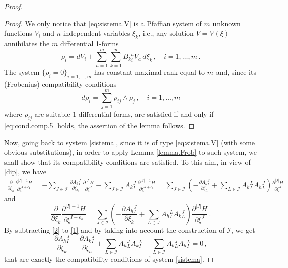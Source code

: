 \documentclass{article}
\newcommand{\I}{\mathcal{I}}
\newcommand{\de}{\partial}
\begin{document}
\begin{proof}
\begin{proof}
We only notice that \eqref{eq:sistema.V} is a Pfaffian system of $m$ unknown functions $V_i$ and $n$ independent variables $\xi_k$, i.e., any solution $V=V(\xi)$ annihilates the $m$ differential 1-forms
$$
\rho_i= d V_i + \sum_{a=1}^m\sum_{k=1}^n B_k{}^a_i V_a\, d\xi_k\,, \quad i=1,\dots, m\,.
$$
The system $\{\rho_i=0\}_{i=1,\dots,m}$ has constant maximal rank equal to $m$ and, since its (Frobenius) compatibility conditions
$$
d\rho_i=\sum_{j=1}^m\rho_{ij}\wedge\rho_j\,,\quad i=1,\dots,m
$$
where $\rho_{ij}$ are suitable $1$-differential forms,
are satisfied if and only if \eqref{eq:cond.comp.5} holds, the assertion of the lemma follows.
\end{proof}
Now, going back to system \eqref{sistema}, since it is of type \eqref{eq:sistema.V} (with some obvious substitutions), in order to apply Lemma \ref{lemma.Frob} to such system,
we shall show that its compatibility conditions are satisfied. To this aim, in view of \eqref{dip}, we have
\begin{multline}\label{1}
\frac{\de}{\de \xi_h}     \frac{\de^{|I|+1} H }{\de\xi^{I+e_k} }= 
- \sum_{J\in\mathcal{I}} \frac{\de A_k{}^J_I }{\de\xi_h }
 \,  \frac{\de^{|J|} H }{\de\xi^J }-  \sum_{J\in\mathcal{I}} A_k{}^J_I\,    \frac{\de^{|J|+1} H }{\de\xi^{J+e_h} }
= \sum_{J\in\mathcal{I}}\left( -  \frac{\de  A_k{}^J_I}{\de \xi_h } +  \sum_{L\in\mathcal{I}}A_k{}^L_I A_h{}^J_L\right)   \frac{\de^{|J|} H }{\de\xi^J }
\end{multline}
and
\begin{equation}\label{2}
\frac{\de}{\de \xi_k}     \frac{\de^{|I|+1} H }{\de\xi^{I+e_h} }  = 
 \sum_{J\in\mathcal{I}}\left( -  \frac{\de A_h{}^J_I  }{\de \xi_k} +  \sum_{L\in\mathcal{I}}A_h{}^L_I A_k{}^J_L\right)  \frac{\de^{|J|} H }{\de\xi^J }\,.
\end{equation}
By subtracting \eqref{2} to \eqref{1} and by taking into account the construction of $\I$, we get
\begin{equation}\label{comp}
\frac{\de A_h{}^J_I }{\de \xi_k} - \frac{\de A_k{}^J_I }{\de \xi_h} +  \sum_{L\in\mathcal{I}} A_h{}^J_LA_k{}^L_I  -  \sum_{L\in\mathcal{I}} A_k{}^J_L A_h{}^L_I =0\,,
\end{equation}
that are exactly the compatibility conditions of system \eqref{sistema}.


\end{proof}
\end{document}
